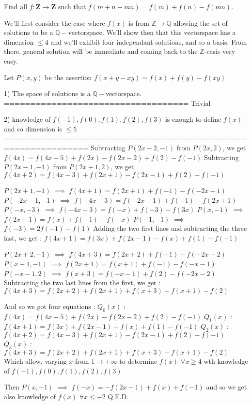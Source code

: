 \begin{solution}
	\begin{tcolorbox}Find all $f:\mathbf{Z} \rightarrow \mathbf{Z}$ such that
 $ f(m+n-mn)=f(m)+f(n)-f(mn).$\end{tcolorbox}
We'll first consider the case where $f(x)$ is from $\mathbb Z\to\mathbb Q$ allowing the set of solutions to be a $\mathbb Q-$vectorspace.
We'll show then that this vectorspace has a dimension $\le 4$ and we'll exhibit four independant solutions, and so a basis.
From there, general solution will be immediate and coming back to the $\mathbb Z$-casis very easy.

Let $P(x,y)$ be the assertion $f(x+y-xy)=f(x)+f(y)-f(xy)$

1) The space of solutions is a $\mathbb Q-$vectorspace.
===================================
Trivial

2) knowledge of $f(-1),f(0),f(1),f(2),f(3)$ is enough to define $f(x)$ and so dimension is $\le 5$
==============================================================
Subtracting $P(2x-2,-1)$ from $P(2x,2)$, we get $f(4x)=f(4x-5)+f(2x)-f(2x-2)+f(2)-f(-1)$
Subtracting $P(2x-1,-1)$ from $P(2x+1,2)$, we get $f(4x+2)=f(4x-3)+f(2x+1)-f(2x-1)+f(2)-f(-1)$

$P(2x+1,-1)$ $\implies$ $f(4x+1)=f(2x+1)+f(-1)-f(-2x-1)$
$P(-2x-1,-1)$ $\implies$ $f(-4x-3)=f(-2x-1)+f(-1)-f(2x+1)$
$P(-x,-3)$ $\implies$ $f(-4x-3)=f(-x)+f(-3)-f(3x)$
$P(x,-1)$ $\implies$ $f(2x-1)=f(x)+f(-1)-f(-x)$
$P(-1,-1)$ $\implies$ $f(-3)=2f(-1)-f(1)$
Adding the two first lines and subtracting the three last, we get : $f(4x+1)=f(3x)+f(2x-1)-f(x)+f(1)-f(-1)$

$P(2x+2,-1)$ $\implies$ $f(4x+3)=f(2x+2)+f(-1)-f(-2x-2)$
$P(x+1,-1)$ $\implies$ $f(2x+1)=f(x+1)+f(-1)-f(-x-1)$
$P(-x-1,2)$ $\implies$ $f(x+3)=f(-x-1)+f(2)-f(-2x-2)$
Subtracting the two last lines from the first, we get : $f(4x+3)=f(2x+2)+f(2x+1)+f(x+3)-f(x+1)-f(2)$

And so we got four equations :
$Q_0(x)$ : $f(4x)=f(4x-5)+f(2x)-f(2x-2)+f(2)-f(-1)$
$Q_1(x)$ : $f(4x+1)=f(3x)+f(2x-1)-f(x)+f(1)-f(-1)$
$Q_2(x)$ : $f(4x+2)=f(4x-3)+f(2x+1)-f(2x-1)+f(2)-f(-1)$
$Q_3(x)$ : $f(4x+3)=f(2x+2)+f(2x+1)+f(x+3)-f(x+1)-f(2)$
Which allow, varying $x$ from $1\to+\infty$ to determine $f(x)$ $\forall x\ge 4$ wth knowledge of $f(-1),f(0),f(1),f(2),f(3)$

Then $P(x,-1)$ $\implies$ $f(-x)=-f(2x-1)+f(x)+f(-1)$ and so we get also knowledge of $f(x)$ $\forall x\le -2$
Q.E.D.


\end{solution}
